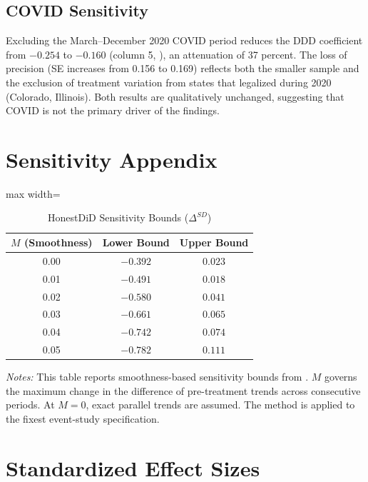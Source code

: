 \documentclass[12pt]{article}
\begin{document}
\subsection{COVID Sensitivity}

Excluding the March--December 2020 COVID period reduces the DDD coefficient from $-0.254$ to $-0.160$ (column 5, ), an attenuation of 37 percent. The loss of precision (SE increases from 0.156 to 0.169) reflects both the smaller sample and the exclusion of treatment variation from states that legalized during 2020 (Colorado, Illinois). Both results are qualitatively unchanged, suggesting that COVID is not the primary driver of the findings.


\section{Sensitivity Appendix}
\label{app:sensitivity}

\begin{table}[H]
\centering
\caption{HonestDiD Sensitivity Bounds ($\Delta^{SD}$)}
\label{tab:honestdid}
\begin{adjustbox}{max width=\textwidth}
\begin{tabular}{ccc}
\toprule
$M$ (Smoothness) & Lower Bound & Upper Bound \\
\midrule
0.00 & $-0.392$ & $0.023$ \\
0.01 & $-0.491$ & $0.018$ \\
0.02 & $-0.580$ & $0.041$ \\
0.03 & $-0.661$ & $0.065$ \\
0.04 & $-0.742$ & $0.074$ \\
0.05 & $-0.782$ & $0.111$ \\
\bottomrule
\end{tabular}
\end{adjustbox}
\vspace{4pt}
{\small\emph{Notes:} This table reports smoothness-based sensitivity bounds from \citet{rambachan2023more}. $M$ governs the maximum change in the difference of pre-treatment trends across consecutive periods. At $M = 0$, exact parallel trends are assumed. The method is applied to the fixest event-study specification.}
\end{table}


\section{Standardized Effect Sizes}
\label{sec:sde}
\end{document}
